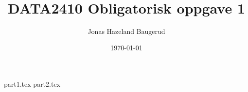 \documentclass[a4paper,11pt]{article}
\title{DATA2410 Obligatorisk oppgave 1}
\author{Jonas Hazeland Baugerud}
\date{\today}
\begin{document}
\maketitle
\newpage
\tableofcontents
\newpage

{part1.tex}
{part2.tex}
\end{document}
